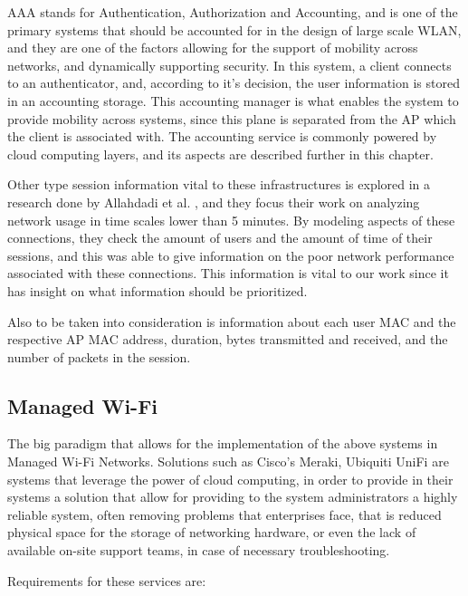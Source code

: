 AAA stands for Authentication, Authorization and Accounting, and is one of the primary systems that should be accounted for in the design of large scale WLAN, and they are one of the factors allowing for the support of mobility across networks, and dynamically supporting security. In this system, a client connects to an authenticator, and, according to it's decision, the user information is stored in an accounting storage. This accounting manager is what enables the system to provide mobility across systems, since this plane is separated from the AP which the client is associated with. The accounting service is commonly powered by cloud computing layers, and its aspects are described further in this chapter.

\par Other type session information vital to these infrastructures is explored in a research done by Allahdadi et al. \cite{allahdadi_predicting_2013}, and they focus their work on analyzing network usage in time scales lower than 5 minutes. By modeling aspects of these connections, they check the amount of users and the amount of time of their sessions, and this was able to give information on the poor network performance associated with these connections. This information is vital to our work since it has insight on what information should be prioritized. 

\par Also to be taken into consideration is information about each user MAC and the respective AP MAC address, duration, bytes transmitted and received, and the number of packets in the session.

\subsection {Managed Wi-Fi}
\hspace {5mm}

The big paradigm that allows for the implementation of the above systems in Managed Wi-Fi Networks. Solutions such as Cisco's Meraki, Ubiquiti UniFi are systems that leverage the power of cloud computing, in order to provide in their systems a solution that allow for providing to the system administrators a highly reliable system, often removing problems that enterprises face, that is reduced physical space for the storage of networking hardware, or even the lack of available on-site support teams, in case of necessary troubleshooting. 

\par Requirements for these services are:

